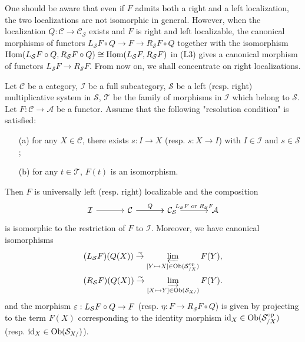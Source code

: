 One should be aware that even if $F$ admits both a right and a left localization, the two localizations are not isomorphic in general. However, when the localization $Q:\mathcal{C}\to\mathcal{C}_\mathcal{S}$ exists and $F$ is right and left localizable, the canonical morphisms of functors $L_\mathcal{S}F\circ Q\to F\to R_\mathcal{S}F\circ Q$ together with the isomorphism $\mathrm{Hom}(L_\mathcal{S}F\circ Q,R_\mathcal{S}F\circ Q)\cong\mathrm{Hom}(L_\mathcal{S}F,R_\mathcal{S}F)$ in (L3) gives a canonical morphism of functors $L_\mathcal{S}F\to R_\mathcal{S}F$. From now on, we shall concentrate on right localizations.

\begin{proposition}\label{category localization of functor exist if}
Let $\mathcal{C}$ be a category, $\mathcal{I}$ be a full subcategory, $\mathcal{S}$ be a left (resp. right) multiplicative system in $\mathcal{S}$, $\mathcal{T}$ be the family of morphisms in $\mathcal{I}$ which belong to $\mathcal{S}$. Let $F:\mathcal{C}\to\mathcal{A}$ be a functor. Assume that the following "resolution condition" is satisfied:
\begin{enumerate}
    \item[(a)] for any $X\in\mathcal{C}$, there exists $s:I\to X$ (resp. $s:X\to I$) with $I\in\mathcal{I}$ and $s\in\mathcal{S}$;
    \item[(b)] for any $t\in\mathcal{T}$, $F(t)$ is an isomorphism.
\end{enumerate}
Then $F$ is universally left (resp. right) localizable and the composition 
\[\begin{tikzcd}[column sep=12mm]
\mathcal{I}\ar[r]&\mathcal{C}\ar[r,"Q"]\ar[r]&\mathcal{C}_\mathcal{S}\ar[r,"\text{$L_\mathcal{S}F$ or $R_\mathcal{S}F$}"]&\mathcal{A}
\end{tikzcd}\]
is isomorphic to the restriction of $F$ to $\mathcal{I}$. Moreover, we have canonical isomorphisms
\begin{gather}
(L_\mathcal{S}F)(Q(X)) \stackrel{\sim}{\to} \varprojlim_{[Y\rightarrowtail X]\in\mathrm{Ob}(\mathcal{S}_{/X}^{\mathrm{op}})}F(Y),\label{category localization of functor exist if-1}\\
(R_\mathcal{S}F)(Q(X)) \stackrel{\sim}{\to} \varinjlim_{[X\rightarrowtail Y]\in\mathrm{Ob}(\mathcal{S}_{X/})}F(Y).\label{category localization of functor exist if-2}
\end{gather}
and the morphism $\varepsilon:L_\mathcal{S}F\circ Q\to F$ (resp. $\eta:F\to R_\mathcal{S}F\circ Q$) is given by projecting to the term $F(X)$ corresponding to the identity morphism $\operatorname{id}_X\in\mathrm{Ob}(\mathcal{S}_{/X}^{\mathrm{op}})$ (resp. $\operatorname{id}_X\in\mathrm{Ob}(\mathcal{S}_{X/})$).
\end{proposition}
